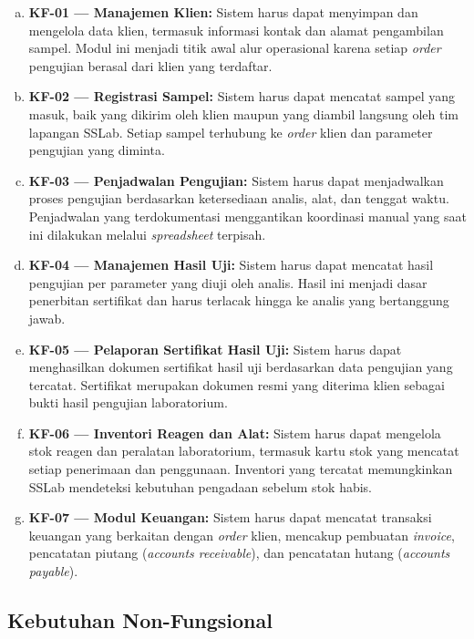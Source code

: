 \begin{enumerate}[a)]
    \item \textbf{KF-01 — Manajemen Klien:} Sistem harus dapat menyimpan dan mengelola data klien, termasuk informasi kontak dan alamat pengambilan sampel. Modul ini menjadi titik awal alur operasional karena setiap \textit{order} pengujian berasal dari klien yang terdaftar.

    \item \textbf{KF-02 — Registrasi Sampel:} Sistem harus dapat mencatat sampel yang masuk, baik yang dikirim oleh klien maupun yang diambil langsung oleh tim lapangan SSLab. Setiap sampel terhubung ke \textit{order} klien dan parameter pengujian yang diminta.

    \item \textbf{KF-03 — Penjadwalan Pengujian:} Sistem harus dapat menjadwalkan proses pengujian berdasarkan ketersediaan analis, alat, dan tenggat waktu. Penjadwalan yang terdokumentasi menggantikan koordinasi manual yang saat ini dilakukan melalui \textit{spreadsheet} terpisah.

    \item \textbf{KF-04 — Manajemen Hasil Uji:} Sistem harus dapat mencatat hasil pengujian per parameter yang diuji oleh analis. Hasil ini menjadi dasar penerbitan sertifikat dan harus terlacak hingga ke analis yang bertanggung jawab.

    \item \textbf{KF-05 — Pelaporan Sertifikat Hasil Uji:} Sistem harus dapat menghasilkan dokumen sertifikat hasil uji berdasarkan data pengujian yang tercatat. Sertifikat merupakan dokumen resmi yang diterima klien sebagai bukti hasil pengujian laboratorium.

    \item \textbf{KF-06 — Inventori Reagen dan Alat:} Sistem harus dapat mengelola stok reagen dan peralatan laboratorium, termasuk kartu stok yang mencatat setiap penerimaan dan penggunaan. Inventori yang tercatat memungkinkan SSLab mendeteksi kebutuhan pengadaan sebelum stok habis.

    \item \textbf{KF-07 — Modul Keuangan:} Sistem harus dapat mencatat transaksi keuangan yang berkaitan dengan \textit{order} klien, mencakup pembuatan \textit{invoice}, pencatatan piutang (\textit{accounts receivable}), dan pencatatan hutang (\textit{accounts payable}).
\end{enumerate}

\subsection{Kebutuhan Non-Fungsional}

